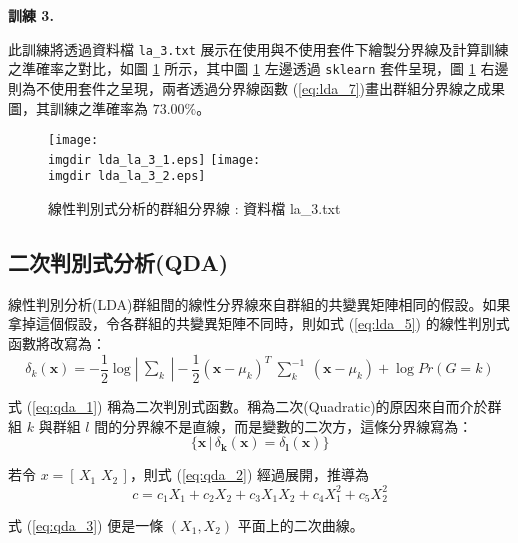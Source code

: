 \textbf{\large 訓練 3.}

此訓練將透過資料檔 \verb|la_3.txt| 展示在使用與不使用套件下繪製分界線及計算訓練之準確率之對比，如圖 \ref{fig:lda_la_3} 所示，其中圖 \ref{fig:lda_la_3} 左邊透過 \verb|sklearn| 套件呈現，圖 \ref{fig:lda_la_3} 右邊則為不使用套件之呈現，兩者透過分界線函數 (\ref{eq:lda_7})畫出群組分界線之成果圖，其訓練之準確率為 $73.00\%$。
\begin{figure}[H]
\centering
\texttt{[image: \\imgdir lda\_la\_3\_1.eps]}
\texttt{[image: \\imgdir lda\_la\_3\_2.eps]}
\caption{線性判別式分析的群組分界線 : 資料檔 la\_3.txt} 
\label{fig:lda_la_3}
\end{figure}
\subsection{二次判別式分析(QDA)}
線性判別分析(LDA)群組間的線性分界線來自群組的共變異矩陣相同的假設。如果拿掉這個假設，令各群組的共變異矩陣不同時，則如式 (\ref{eq:lda_5}) 的線性判別式函數將改寫為：
\begin{equation}\label{eq:qda_1}
\delta_k(\mathbf{x}) = -\frac{1}{2} \log|\begin{matrix} \sum_k \end{matrix}| - \frac{1}{2}(\mathbf{x} - \mu_k)^T \begin{matrix} \sum_k^{-1} \end{matrix}(\mathbf{x} - \mu_k) + \log Pr(G = k)
\end{equation}

式 (\ref{eq:qda_1}) 稱為二次判別式函數。稱為二次(Quadratic)的原因來自而介於群組 $k$ 與群組 $l$ 間的分界線不是直線，而是變數的二次方，這條分界線寫為：
\begin{equation}\label{eq:qda_2}
\{\mathbf{x}\,|\,\delta_{\mathbf{k}}(\mathbf{x}) = \delta_{\mathbf{l}}(\mathbf{x})\}
\end{equation}

若令 $x = [\,X_1\,\, X_2\,]$，則式 (\ref{eq:qda_2}) 經過展開，推導為
\begin{equation}\label{eq:qda_3}
c = c_1 X_1 + c_2 X_2 + c_3 X_1 X_2 + c_4 X_1^2 + c_5 X_2^2
\end{equation}

式 (\ref{eq:qda_3}) 便是一條 $(X_1, X_2)$ 平面上的二次曲線。

